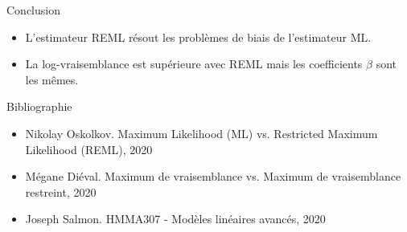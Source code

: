 \documentclass[unknownkeysallowed]{beamer}
\begin{document}
\begin{frame}{Conclusion}

\begin{itemize}
    \item L'estimateur \rm{REML} résout les problèmes de biais de l'estimateur \rm{ML}.
    \item La log-vraisemblance est supérieure avec \rm{REML} mais les coefficients $\beta$ sont les mêmes.
\end{itemize}

\end{frame}




\begin{frame}{Bibliographie}
\printbibliography

\begin{itemize}

    \item Nikolay Oskolkov. Maximum Likelihood (ML) vs. Restricted Maximum Likelihood (REML), 2020
    \item Mégane Diéval. Maximum de vraisemblance vs. Maximum de vraisemblance restreint, 2020
    
    \item Joseph Salmon. HMMA307 - Modèles linéaires avancés, 2020
    
\end{itemize}

\end{frame}
\end{document}
